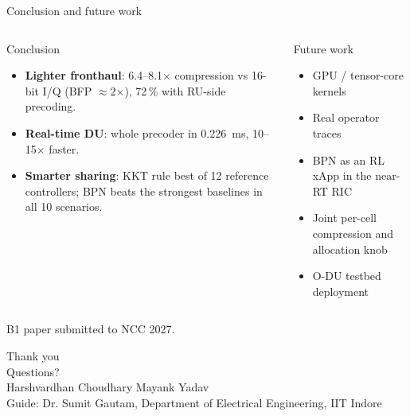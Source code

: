 \documentclass[aspectratio=169,11pt]{beamer}
\begin{document}
\begin{frame}{Conclusion and future work}
\begin{columns}[T]
\begin{block}{Conclusion}
\small
\begin{itemize}
  \item \textbf{Lighter fronthaul}: 6.4--8.1$\times$ compression vs 16-bit I/Q (BFP $\approx$2$\times$), 72\,\% with RU-side precoding.
  \item \textbf{Real-time DU}: whole precoder in 0.226~ms, 10--15$\times$ faster.
  \item \textbf{Smarter sharing}: KKT rule best of 12 reference controllers; BPN beats the strongest baselines in all 10 scenarios.
\end{itemize}
\end{block}
\begin{block}{Future work}
\small
\begin{itemize}
  \item GPU / tensor-core kernels
  \item Real operator traces
  \item BPN as an RL xApp in the near-RT RIC
  \item Joint per-cell compression and allocation knob
  \item O-DU testbed deployment
\end{itemize}
\end{block}
\end{columns}
\vspace{0.3cm}
\centering\small B1 paper submitted to NCC 2027.
\end{frame}

\begin{frame}
\centering
\vspace{1cm}
{\Huge \textcolor{iitblue}{Thank you}}\\[0.8cm]
{\Large Questions?}\\[1cm]
\small Harshvardhan Choudhary \quad Mayank Yadav\\
Guide: Dr. Sumit Gautam, Department of Electrical Engineering, IIT Indore
\end{frame}
\end{document}
